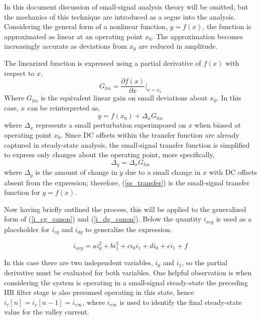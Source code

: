 \documentclass[conference]{IEEEtran}
\begin{document}
In this document discussion of small-signal analysis theory will be omitted, but the mechanics of this technique are introduced as a segue into the analysis.  Considering the general form of a nonlinear function, $y = f(x)$, the function is approximated as linear at an operating point $x_0$.  The approximation becomes increasingly accurate as deviations from $x_0$ are reduced in amplitude.

The linearized function is expressed using a partial derivative of $f(x)$ with respect to $x$,
\begin{equation}
	G_{lin} = \frac{\partial f(x)}{\partial x}\bigg|_{x=x_0}
\end{equation}
Where $G_{lin}$ is the equivalent linear gain on small deviations about $x_0$. In this case, $x$ can be reinterpreted as,
\begin{equation}
y = f(x_0) + \Delta_x G_{lin}
\end{equation}
where $\Delta_x$ represents a small perturbation superimposed on $x$ when biased at operating point $x_0$.  Since DC offsets within the transfer function are already captured in steady-state analysis, the small-signal transfer function is simplified to express only changes about the operating point, more specifically,
 \begin{equation}
 \Delta_y = \Delta_x G_{lin} \label{ss_transfer}
 \end{equation}
where $\Delta_y$ is the amount of change in $y$ due to a small change in $x$ with DC offsets absent from the expression; therefore, (\ref{ss_transfer}) is the small-signal transfer function for $y=f(x)$.

Now having briefly outlined the process, this will be applied to the generalized form of (\ref{i_cg_canon}) and (\ref{i_dg_canon}). Below the quantity $i_{avg}$ is used as a placeholder for $i_{cg}$ and $i_{dg}$ to generalize the expression.

\begin{equation}
i_{avg} = a i_0^2+b i_1^2+c i_0i_1+d i_0+e i_1+f  \label{i_av_gen}
\end{equation}

In this case there are two independent variables, $i_0$ and $i_1$, so the partial derivative must be evaluated for both variables. One helpful observation is when considering the system is operating in a small-signal steady-state the preceding IIR filter stage is also presumed operating in this state, hence $i_v[n] = i_v[n-1] = i_{v\infty}$, where $i_{v\infty}$ is used to identify the final steady-state value for the valley current.
\end{document}
